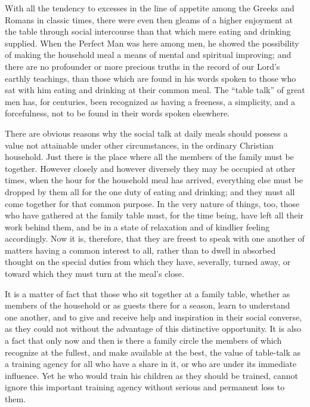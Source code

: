\documentclass[
]{book}
\begin{document}
With all the tendency to excesses in the line of appetite among the Greeks and Romans in classic times, there were even then gleams of a higher enjoyment at the table through social intercourse than that which mere eating and drinking supplied. When the Perfect Man was here among men, he showed the possibility of making the household meal a means of mental and spiritual improving; and there are no profounder or more precious truths in the record of our Lord's earthly teachings, than those which are found in his words spoken to those who sat with him eating and drinking at their common meal. The ``table talk'' of great men has, for centuries, been recognized as having a freeness, a simplicity, and a forcefulness, not to be found in their words spoken elsewhere.

There are obvious reasons why the social talk at daily meals should possess a value not attainable under other circumstances, in the ordinary Christian household. Just there is the place where all the members of the family must be together. However closely and however diversely they may be occupied at other times, when the hour for the household meal has arrived, everything else must be dropped by them all for the one duty of eating and drinking; and they must all come together for that common purpose. In the very nature of things, too, those who have gathered at the family table must, for the time being, have left all their work behind them, and be in a state of relaxation and of kindlier feeling accordingly. Now it is, therefore, that they are freest to speak with one another of matters having a common interest to all, rather than to dwell in absorbed thought on the special duties from which they have, severally, turned away, or toward which they must turn at the meal's close.

It is a matter of fact that those who sit together at a family table, whether as members of the household or as guests there for a season, learn to understand one another, and to give and receive help and inspiration in their social converse, as they could not without the advantage of this distinctive opportunity. It is also a fact that only now and then is there a family circle the members of which recognize at the fullest, and make available at the best, the value of table-talk as a training agency for all who have a share in it, or who are under its immediate influence. Yet he who would train his children as they should be trained, cannot ignore this important training agency without serious and permanent loss to them.
\end{document}
